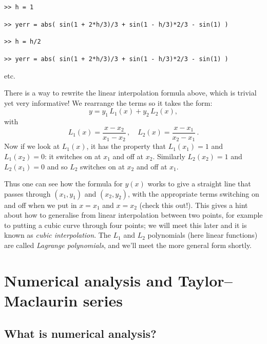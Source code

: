 \noindent
\texttt{>> h = 1}

\noindent
\texttt{>> yerr = abs( sin(1 + 2*h/3)/3 + sin(1 - h/3)*2/3 - sin(1) )}

\noindent
\texttt{>> h = h/2}

\noindent
\texttt{>> yerr = abs( sin(1 + 2*h/3)/3 + sin(1 - h/3)*2/3 - sin(1) )}

\noindent
etc.

There is a way to rewrite the linear interpolation formula above, which is trivial yet very informative!
We rearrange the terms so it takes the form:
%
\begin{equation}
y = %
y_1 \, L_1(x) + y_2 \, L_2(x), 
\label{eq:lag1}
\end{equation}
%
with 
%
\begin{equation}
L_1(x) = \frac{x - x_{2}}{x_1-x_{2}} \,  , \quad L_2(x) = \frac{x - x_1}{x_{2} - x_1}\,  .
\label{eq:lag2}
\end{equation}
%
Now if we look at $L_1(x)$, it has the property that $L_1(x_1)=1$ and $L_1(x_2)=0$: it switches on at $x_1$ and off at $x_2$.  Similarly 
$L_2(x_2)=1$ and $L_2(x_1)=0$ and so $L_2$ switches on at $x_2$ and off at $x_1$. 

Thus one can see how the formula for $y(x)$ works to give a straight line that passes through $(x_1,y_1)$ and $(x_2,y_2)$, with the appropriate terms switching on and off when we put in $x=x_1$ and $x=x_2$ (check this out!). This gives a hint about how to generalise from linear interpolation between two points, for example to putting a cubic curve through four points; we will meet this later and it is known as \emph{cubic interpolation}. The $L_1$ and $L_2$ polynomials (here linear functions) are called \emph{Lagrange polynomials}, and we'll meet the more general form shortly. 

\section{Numerical analysis and Taylor--Maclaurin series}
\label{sec:Taylor_series}


\subsection{What is numerical analysis?}

